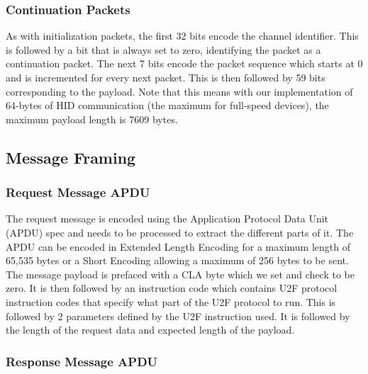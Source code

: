 \documentclass[acmtog,review]{acmart}
\begin{document}
\subsubsection{Continuation Packets} As with initialization packets, the first 32 bits
encode the channel identifier. This is followed by a bit that is always set to zero,
identifying the packet as a continuation packet. 
The next 7 bits encode the packet sequence which starts at 0 and is incremented for
every next packet. This is then followed by 59 bits corresponding to the payload.
Note that this means with our implementation of 64-bytes of HID communication
(the maximum for full-speed devices), the maximum payload length is 7609 bytes.

\subsection{Message Framing}

\subsubsection{Request Message APDU}

The request message is encoded using the Application Protocol Data Unit (APDU) spec
and needs to be processed to extract the different parts of it. The APDU can be
encoded in 
Extended Length Encoding for a maximum length of 65,535 bytes or a Short Encoding
allowing a maximum of 256 bytes to be sent. 
The message payload is prefaced with a CLA byte which we set and check to be zero.
It is then followed by an instruction code which contains U2F protocol instruction
codes that specify what part of the U2F protocol to run. This is followed by 2 parameters
defined by the U2F instruction used. It is followed by the length of the request data and 
expected length of the payload.

\subsubsection{Response Message APDU}
\end{document}
